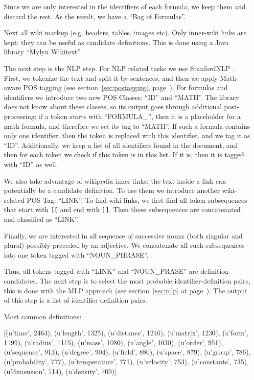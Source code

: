 Since we are only interested in the identifiers of each formula, we
keep them and discard the rest. As the result, we have a ``Bag of Formulas''.

Next all wiki markup (e.g. headers, tables, images etc). Only inner-wiki
links are kept: they can be useful as candidate definitions. This is done
using a Java library ``Mylyn Wikitext'' \cite{mylynwikitext}.


The next step is the NLP step. For NLP related tasks we use StanfordNLP
\cite{manning2014stanford}. First, we tokenize the text and split it
by sentences, and then we apply Math-aware POS tagging
(see section~\ref{sec:postagging}, page~\pageref{sec:postagging}).
For formulas and identifiers we introduce two new POS Classes: ``ID'' and ``MATH''.
The library does not know about these classes, so its output
goes through additional post-processing: if a token starts with ``FORMULA\_'',
then it is a placeholder for a math formula, and therefore we set its tag
to ``MATH''. If such a formula contains only one identifier, then the token
is replaced with this identifier, and we tag it as ``ID''.
Additionally, we keep a list of all identifiers found in the document,
and then for each token we check if this token is in this list.
If it is, then it is tagged with ``ID'' as well.

We also take advantage of wikipedia inner links: the text inside a link
can potentially be a candidate definition. To use them we introduce
another wiki-related POS Tag: ``LINK''. To find wiki links, we first find
all token subsequences that start with \verb|[[| and end with \verb|]]|.
Then these subsequences are concatenated and classified as ``LINK''.

Finally, we are interested in all sequence of successive nouns
(both singular and plural) possibly preceded by an adjective.
We concatenate all such subsequences into one token tagged with ``NOUN\_PHRASE''.

Thus, all tokens tagged with ``LINK'' and ``NOUN\_PRASE'' are definition candidates.
The next step is to select the most probable identifier-definition pairs, this is
done with the MLP approach (see section~\ref{sec:mlp} at page~\pageref{sec:mlp}).
The output of this step is a list of identifier-definition pairs. 


Most common definitions:

[(u'time', 2464), (u'length', 1325), (u'distance', 1246), (u'matrix', 1230), (u'form', 1199), (u'radius', 1115), (u'mass', 1080), (u'angle', 1030), (u'order', 951), (u'sequence', 913), (u'degree', 904), (u'field', 880), (u'space', 879), (u'group', 786), (u'probability', 777), (u'temperature', 771), (u'velocity', 753), (u'constants', 735), (u'dimension', 714), (u'density', 700)]

